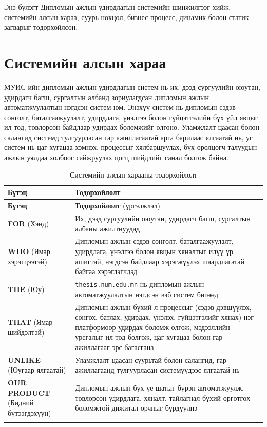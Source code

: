 \hspace*{0.6cm}
Энэ бүлэгт Дипломын ажлын удирдлагын системийн шинжилгээг хийж, системийн алсын хараа, суурь нөхцөл, бизнес процесс, динамик болон статик загварыг тодорхойлсон. 

\section{Системийн алсын хараа}

МУИС-ийн дипломын ажлын удирдлагын систем нь их, дээд сургуулийн оюутан, удирдагч багш, сургалтын албанд зориулагдсан дипломын ажлын автоматжуулалтын нэгдсэн систем юм. Энэхүү систем нь дипломын сэдэв сонголт, баталгаажуулалт, удирдлага, үнэлгээ болон гүйцэтгэлийн бүх үйл явцыг ил тод, төвлөрсөн байдлаар удирдах боломжийг олгоно. Уламжлалт цаасан болон салангид системд тулгуурласан гар ажиллагаатай арга барилаас ялгаатай нь, уг систем нь цаг хугацаа хэмнэх, процессыг хялбаршуулах, бүх оролцогч талуудын ажлын уялдаа холбоог сайжруулах цогц шийдлийг санал болгож байна.

\begin{longtable}{p{3.5cm} p{12.5cm}}
\caption{Системийн алсын харааны тодорхойлолт} \label{tab:system-vision} \\
\toprule
\textbf{Бүтэц} & \textbf{Тодорхойлолт} \\ 
\midrule
\endfirsthead
\toprule
\textbf{Бүтэц} & \textbf{Тодорхойлолт} (үргэлжлэл) \\ 
\midrule
\endhead
\bottomrule
\endfoot

\textbf{FOR} \newline (Хэнд) & Их, дээд сургуулийн оюутан, удирдагч багш, сургалтын албаны ажилтнуудад \\ \addlinespace
\textbf{WHO} \newline (Ямар хэрэгцээтэй) & Дипломын ажлын сэдэв сонголт, баталгаажуулалт, удирдлага, үнэлгээ болон явцын хяналтыг илүү үр ашигтай, нэгдсэн байдлаар хэрэгжүүлэх шаардлагатай байгаа хэрэглэгчдэд \\ \addlinespace
\textbf{THE} \newline (Юу) & \texttt{thesis.num.edu.mn} нь дипломын ажлын автоматжуулалтын нэгдсэн вэб систем бөгөөд \\ \addlinespace
\textbf{THAT} \newline (Ямар шийдэлтэй) & Дипломын ажлын бүхий л процессыг (сэдэв дэвшүүлэх, сонгох, батлах, удирдах, үнэлэх, гүйцэтгэлийг хянах) нэг платформоор удирдах боломж олгож, мэдээллийн урсгалыг ил тод болгож, цаг хугацаа болон гар ажиллагааг эрс багасгана \\ \addlinespace
\textbf{UNLIKE} \newline (Юугаар ялгаатай) & Уламжлалт цаасан суурьтай болон салангид, гар ажиллагаанд тулгуурласан системүүдээс ялгаатай нь \\ \addlinespace
\textbf{OUR PRODUCT} \newline (Бидний бүтээгдэхүүн) & Дипломын ажлын бүх үе шатыг бүрэн автоматжуулж, төвлөрсөн удирдлага, хяналт, тайлагнал бүхий өргөтгөх боломжтой дижитал орчныг бүрдүүлнэ \\ \addlinespace

\end{longtable}

